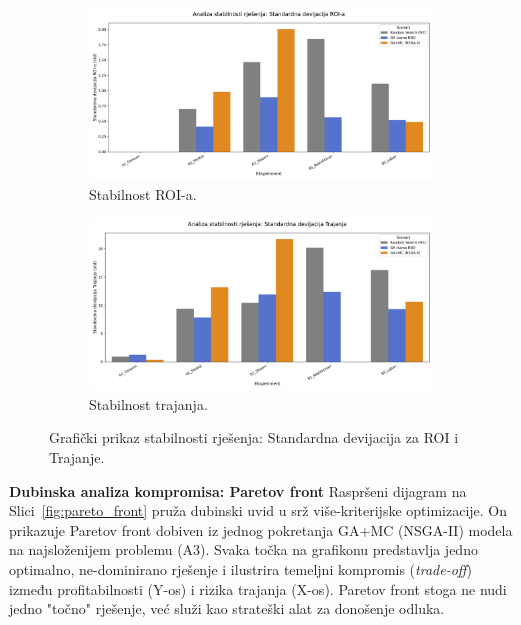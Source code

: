 \begin{figure}[H]
    \centering
    \begin{subfigure}[b]{0.48\textwidth}
        \centering
        \includegraphics[width=\textwidth]{slike/grafikoni_final/C_stabilnost_roi.png}
        \caption{Stabilnost ROI-a.}
    \end{subfigure}
    \hfill
    \begin{subfigure}[b]{0.48\textwidth}
        \centering
        \includegraphics[width=\textwidth]{slike/grafikoni_final/C_stabilnost_trajanje.png}
        \caption{Stabilnost trajanja.}
    \end{subfigure}
    \caption{Grafički prikaz stabilnosti rješenja: Standardna devijacija za ROI i Trajanje.}
    \label{fig:stabilnost}
\end{figure}

\textbf{Dubinska analiza kompromisa: Paretov front}
Raspršeni dijagram na Slici~\ref{fig:pareto_front} pruža dubinski uvid u srž više-kriterijske optimizacije. On prikazuje Paretov front dobiven iz jednog pokretanja GA+MC (NSGA-II) modela na najsloženijem problemu (A3). Svaka točka na grafikonu predstavlja jedno optimalno, ne-dominirano rješenje i ilustrira temeljni kompromis (\emph{trade-off}) između profitabilnosti (Y-os) i rizika trajanja (X-os). Paretov front stoga ne nudi jedno "točno" rješenje, već služi kao strateški alat za donošenje odluka.


